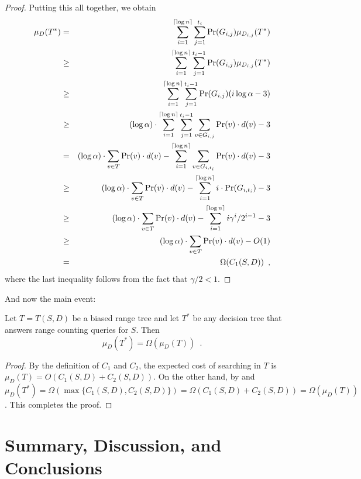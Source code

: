 \documentclass[lotsofwhite,charterfonts]{patmorin}
\newcommand{\depth}{d}
\begin{document}
\begin{proof}
Putting this all together, we obtain
\begin{eqnarray*}
\mu_D(T^*) 
  & = & \sum_{i=1}^{\ceil{\log n}}\sum_{j=1}^{t_i}\Pr(G_{i,j})\mu_{D_{i,j}}(T^*) \\
  & \ge & \sum_{i=1}^{\ceil{\log n}}
    \sum_{j=1}^{t_i-1}\Pr(G_{i,j})\mu_{D_{i,j}}(T^*) \\
  & \ge & \sum_{i=1}^{\ceil{\log n}}\sum_{j=1}^{t_i-1}\Pr(G_{i,j})( i\log\alpha -3) \\
  & \ge & (\log\alpha)\cdot
         \sum_{i=1}^{\ceil{\log n}}\sum_{j=1}^{t_i-1}
		\sum_{v\in G_{i,j}}\Pr(v)\cdot\depth(v) - 3\\
  & = & (\log\alpha)\cdot\sum_{v\in T}\Pr(v)\cdot \depth(v)
          -    \sum_{i=1}^{\ceil{\log n}}
		\sum_{v\in G_{i,t_i}}\Pr(v)\cdot\depth(v) - 3\\
  & \ge & (\log\alpha)\cdot\sum_{v\in T}\Pr(v)\cdot \depth(v)
          -    \sum_{i=1}^{\ceil{\log n}}i\cdot\Pr(G_{i,t_i}) - 3 \\
  & \ge & (\log\alpha)\cdot\sum_{v\in T}\Pr(v)\cdot \depth(v)
          -    \sum_{i=1}^{\ceil{\log n}}i\gamma^i/2^{i-1} - 3 \\
  & \ge &  (\log\alpha)\cdot\sum_{v\in T}\Pr(v)\cdot \depth(v) - O(1) \\
  & = & \Omega(C_1(S,D)) \enspace ,
\end{eqnarray*}
where the last inequality follows from the fact that $\gamma/2 < 1$. 
\end{proof}

And now the main event:

\begin{thm}
Let $T=T(S,D)$ be a biased range tree and let $T^*$ be any decision
tree that answers range counting queries for $S$.  Then
\[
  \mu_D(T^*) = \Omega(\mu_D(T)) \enspace .
\]
\end{thm}

\begin{proof}
By the definition of $C_1$ and $C_2$, the expected cost of searching in
$T$ is $\mu_D(T)=O(C_1(S,D)+C_2(S,D))$.  On the other hand, by
 and  $\mu_D(T^*) =
\Omega(\max\{C_1(S,D),C_2(S,D)\}) =
\Omega(C_1(S,D)+C_2(S,D))=\Omega(\mu_D(T))$.  This completes the proof.
\end{proof}

\section{Summary, Discussion, and Conclusions}
\end{document}
